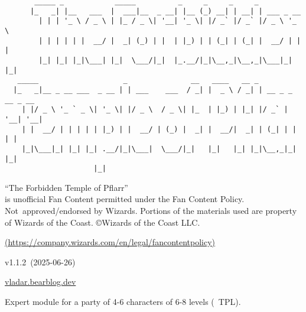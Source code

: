 \documentclass[english,11pt,openany,letterpaper,twocolumn]{book}
\def\title{The Forbidden Temple of Pflarr}
\def\license{%
	``\title''\\is unofficial Fan Content permitted under the Fan Content Policy. Not~approved/endorsed by Wizards. Portions of the materials used are property of Wizards of the Coast. ©Wizards of the Coast LLC.}
\def\licenselink{https://company.wizards.com/en/legal/fancontentpolicy}
\def\modVer{1.1.2}
\def\modDate{2025-06-26}
\begin{document}
\color{darkgray}


\begin{titlepage}

\begin{Verbatim}
       _____ _            _____          _     _     _     _                 
      |_   _| |__   ___  |  ___|__  _ __| |__ (_) __| | __| | ___ _ __       
        | | | '_ \ / _ \ | |_ / _ \| '__| '_ \| |/ _` |/ _` |/ _ \ '_ \      
        | | | | | |  __/ |  _| (_) | |  | |_) | | (_| | (_| |  __/ | | |     
        |_| |_| |_|\___| |_|  \___/|_|  |_.__/|_|\__,_|\__,_|\___|_| |_|     
   _____                    _               __   ____   __ _                 
  |_   _|__ _ __ ___  _ __ | | ___    ___  / _| |  _ \ / _| | __ _ _ __ _ __ 
    | |/ _ \ '_ ` _ \| '_ \| |/ _ \  / _ \| |_  | |_) | |_| |/ _` | '__| '__|
    | |  __/ | | | | | |_) | |  __/ | (_) |  _| |  __/|  _| | (_| | |  | |   
    |_|\___|_| |_| |_| .__/|_|\___|  \___/|_|   |_|   |_| |_|\__,_|_|  |_|   
                     |_|                                                     
\end{Verbatim}

\vfill

\noindent
\begin{minipage}{\textwidth}
	\setmonofont{TruetypewriterPolyglOTT}
	\renewcommand{\FancyVerbFormatLine}[1]{\vspace*{-0.5ex}#1}
\end{minipage}

\vfill
\vfill

\begin{tabbox}[7][7]
\centering
\license

\href{\licenselink}{(\licenselink)}

v\modVer{}~(\modDate{})

{\href{https://vladar.bearblog.dev}{vladar.bearblog.dev}}
\end{tabbox}

\end{titlepage}

\thispagestyle{empty}

\noindent
\begin{minipage}{\textwidth}
	\begin{textbox}
		\centering
		Expert module for a party of 4-6 characters of 6-8 levels (~TPL).
	\end{textbox}
\end{minipage}
\end{document}
